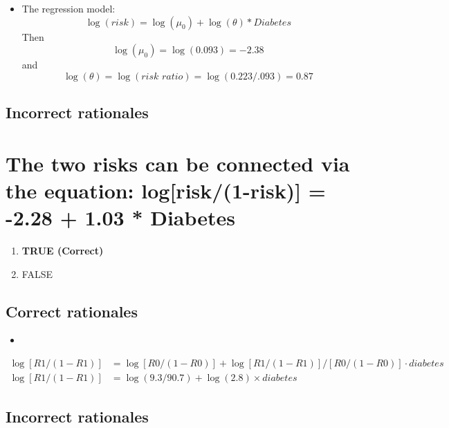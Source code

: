 \documentclass[letterpaper,9pt,twoside,]{pinp}
\providecommand{\tightlist}{%
  \setlength{\itemsep}{0pt}\setlength{\parskip}{0pt}}
\begin{document}
\begin{itemize}
\tightlist
\item
  The regression model:
  \[\log(risk) = \log(\mu_0) + \log(\theta)*Diabetes\] Then
  \[\log(\mu_0) = \log(0.093) = -2.38\] and
  \[\log(\theta) =\log(risk\,\,ratio) = \log(0.223/.093) = 0.87\]
\end{itemize}

\hypertarget{incorrect-rationales-4}{%
\subsection{Incorrect rationales}\label{incorrect-rationales-4}}

\hypertarget{the-two-risks-can-be-connected-via-the-equation-logrisk1-risk--2.28-1.03-diabetes}{%
\section{The two risks can be connected via the equation:
log{[}risk/(1-risk){]} = -2.28 + 1.03 *
Diabetes}\label{the-two-risks-can-be-connected-via-the-equation-logrisk1-risk--2.28-1.03-diabetes}}

\begin{enumerate}
\def\labelenumi{\alph{enumi}.}
\tightlist
\item
  \textbf{TRUE (Correct)}
\item
  FALSE
\end{enumerate}

\hypertarget{correct-rationales-5}{%
\subsection{Correct rationales}\label{correct-rationales-5}}

\begin{itemize}
\tightlist
\item
\end{itemize}

\begin{align*}
\log[R1/(1-R1)] &= \log [R0/(1-R0)] + \log {[R1/(1-R1)] /[R0/(1-R0)]} \cdot diabetes\\
\log [R1/(1-R1)] &= \log(9.3/90.7) + \log(2.8) \times diabetes 
\end{align*}

\hypertarget{incorrect-rationales-5}{%
\subsection{Incorrect rationales}\label{incorrect-rationales-5}}
\end{document}
